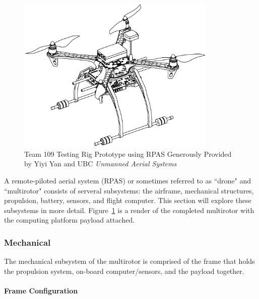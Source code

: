 \begin{figure}[H]
	\centering
	\includegraphics[width=0.85\textwidth]{img/testrigcad1.png}
	\caption[Team 109 Testing Rig Prototype]{Team 109 Testing Rig Prototype using RPAS Generously Provided by Yiyi Yan and UBC \textit{Unmanned Aerial Systems}}
	\label{fig:testrigcad1}
\end{figure}

A remote-piloted aerial system (RPAS) or sometimes referred to as ``drone" and ``multirotor" consists of serveral subsystems: the airframe, mechanical structures, propulsion, battery, sensors, and flight computer. This section will explore these subsystems in more detail. Figure~\ref{fig:testrigcad1} is a render of the completed multirotor with the computing platform payload attached.

\subsubsection{Mechanical}\label{section:drone-mech}
The mechanical subsystem of the multirotor is comprised of the frame that holds the propulsion system, on-board computer/sensors, and the payload together.

\paragraph{Frame Configuration}


